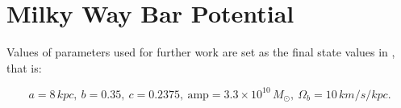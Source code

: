 \documentclass[a4paper,11pt]{article}
\begin{document}
	\section{Milky Way Bar Potential}
		
		Values of parameters used for further work are set as the final state values in \cite{MachadoManos:2016}, that is:
		
		\begin{equation*}
			a = 8\,kpc,~
			b = 0.35,~
			c = 0.2375,~
			\mathrm{amp} = 3.3 \times 10^{10}\, M_{\odot},~
			\Omega_b = 10\,km/s/kpc.
		\end{equation*}
	
	

	
		\nocite{*} %
		
		\small{
			\vspace{0.01in}}
		
	
	
\end{document}
